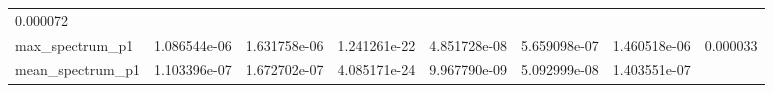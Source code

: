 \documentclass[11pt]{article}
\begin{document}
\begin{longtable}[]{@{}llllllll@{}}
\begin{minipage}[t]{0.08\columnwidth}
0.000072\strut
\end{minipage}\tabularnewline
\begin{minipage}[t]{0.16\columnwidth}\raggedright
max\_spectrum\_p1\strut
\end{minipage} & \begin{minipage}[t]{0.09\columnwidth}\raggedright
1.086544e-06\strut
\end{minipage} & \begin{minipage}[t]{0.09\columnwidth}\raggedright
1.631758e-06\strut
\end{minipage} & \begin{minipage}[t]{0.09\columnwidth}\raggedright
1.241261e-22\strut
\end{minipage} & \begin{minipage}[t]{0.09\columnwidth}\raggedright
4.851728e-08\strut
\end{minipage} & \begin{minipage}[t]{0.09\columnwidth}\raggedright
5.659098e-07\strut
\end{minipage} & \begin{minipage}[t]{0.09\columnwidth}\raggedright
1.460518e-06\strut
\end{minipage} & \begin{minipage}[t]{0.08\columnwidth}\raggedright
0.000033\strut
\end{minipage}\tabularnewline
\begin{minipage}[t]{0.16\columnwidth}\raggedright
mean\_spectrum\_p1\strut
\end{minipage} & \begin{minipage}[t]{0.09\columnwidth}\raggedright
1.103396e-07\strut
\end{minipage} & \begin{minipage}[t]{0.09\columnwidth}\raggedright
1.672702e-07\strut
\end{minipage} & \begin{minipage}[t]{0.09\columnwidth}\raggedright
4.085171e-24\strut
\end{minipage} & \begin{minipage}[t]{0.09\columnwidth}\raggedright
9.967790e-09\strut
\end{minipage} & \begin{minipage}[t]{0.09\columnwidth}\raggedright
5.092999e-08\strut
\end{minipage} & \begin{minipage}[t]{0.09\columnwidth}\raggedright
1.403551e-07\strut
\end{minipage} & \begin{minipage}[t]{0.08\columnwidth}\raggedright

\end{minipage}
\end{longtable}
\end{document}
